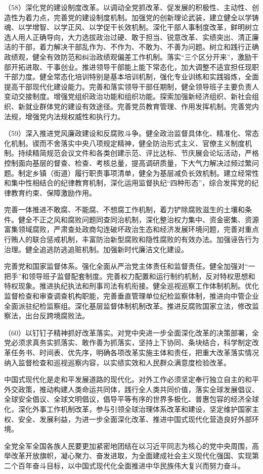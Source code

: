     （58）深化党的建设制度改革。以调动全党抓改革、促发展的积极性、主动性、创造性为着力点，完善党的建设制度机制。加强党的创新理论武装，建立健全以学铸魂、以学增智、以学正风、以学促干长效机制。深化干部人事制度改革，鲜明树立选人用人正确导向，大力选拔政治过硬、敢于担当、锐意改革、实绩突出、清正廉洁的干部，着力解决干部乱作为、不作为、不敢为、不善为问题。树立和践行正确政绩观，健全有效防范和纠治政绩观偏差工作机制。落实“三个区分开来”，激励干部开拓进取、干事创业。推进领导干部能上能下常态化，加大调整不适宜担任现职干部力度。健全常态化培训特别是基本培训机制，强化专业训练和实践锻炼，全面提高干部现代化建设能力。完善和落实领导干部任期制，健全领导班子主要负责人变动交接制度。增强党组织政治功能和组织功能。探索加强新经济组织、新社会组织、新就业群体党的建设有效途径。完善党员教育管理、作用发挥机制。完善党内法规，增强党内法规权威性和执行力。

    （59）深入推进党风廉政建设和反腐败斗争。健全政治监督具体化、精准化、常态化机制。锲而不舍落实中央八项规定精神，健全防治形式主义、官僚主义制度机制。持续精简规范会议文件和各类创建示范、评比达标、节庆展会论坛活动，严格控制面向基层的督查、检查、考核总量，提高调研质量，下大气力解决过频过繁问题。制定乡镇（街道）履行职责事项清单，健全为基层减负长效机制。建立经常性和集中性相结合的纪律教育机制，深化运用监督执纪“四种形态”，综合发挥党的纪律教育约束、保障激励作用。

    完善一体推进不敢腐、不能腐、不想腐工作机制，着力铲除腐败滋生的土壤和条件。健全不正之风和腐败问题同查同治机制，深化整治权力集中、资金密集、资源富集领域腐败，严肃查处政商勾连破坏政治生态和经济发展环境问题，完善对重点行贿人的联合惩戒机制，丰富防治新型腐败和隐性腐败的有效办法。加强诬告行为治理。健全追逃防逃追赃机制。加强新时代廉洁文化建设。

    完善党和国家监督体系。强化全面从严治党主体责任和监督责任。健全加强对“一把手”和领导班子监督配套制度。完善权力配置和运行制约机制，反对特权思想和特权现象。推进执纪执法和刑事司法有机衔接。健全巡视巡察工作体制机制。优化监督检查和审查调查机构职能，完善垂直管理单位纪检监察体制，推进向中管企业全面派驻纪检监察组。深化基层监督体制机制改革。推进反腐败国家立法，修改监察法，出台反跨境腐败法。

    （60）以钉钉子精神抓好改革落实。对党中央进一步全面深化改革的决策部署，全党必须求真务实抓落实、敢作善为抓落实，坚持上下协同、条块结合，科学制定改革任务书、时间表、优先序，明确各项改革实施主体和责任，把重大改革落实情况纳入监督检查和巡视巡察内容，以实绩实效和人民群众满意度检验改革。

    中国式现代化是走和平发展道路的现代化。对外工作必须坚定奉行独立自主的和平外交政策，推动构建人类命运共同体，践行全人类共同价值，落实全球发展倡议、全球安全倡议、全球文明倡议，倡导平等有序的世界多极化、普惠包容的经济全球化，深化外事工作机制改革，参与引领全球治理体系改革和建设，坚定维护国家主权、安全、发展利益，为进一步全面深化改革、推进中国式现代化营造良好外部环境。

    全党全军全国各族人民要更加紧密地团结在以习近平同志为核心的党中央周围，高举改革开放旗帜，凝心聚力、奋发进取，为全面建成社会主义现代化强国、实现第二个百年奋斗目标，以中国式现代化全面推进中华民族伟大复兴而努力奋斗。

